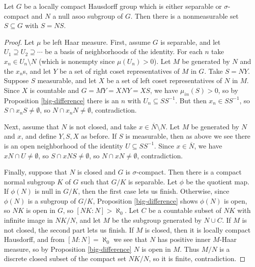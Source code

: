 \begin{lem} Let $G$ be a locally compact Hausdorff group which is either separable or $\sigma$-compact and $N$ a null asoo subgroup of $G$. Then there is a nonmeasurable set $S \subseteq G$ with $S = NS$.
\end{lem}
\begin{proof} Let $\mu$ be left Haar measure. First, assume $G$ is separable, and let $U_1 \supseteq U_2 \supseteq \cdots$ be a basis of neighborhoods of the identity. For each $n$ take $x_n \in U_n \setminus N$ (which is nonempty since $\mu(U_n) > 0$). Let $M$ be generated by $N$ and the $x_n$s, and let $Y$ be a set of right coset representatives of $M$ in $G$. Take $S = NY$. Suppose $S$ measurable, and let $X$ be a set of left coset representatives of $N$ in $M$. Since $X$ is countable and $G = MY = XNY = XS$, we have $\mu_{in}(S) > 0$, so by Proposition \ref{big-difference} there is an $n$ with $U_n \subseteq SS^{-1}$. But then $x_n \in SS^{-1}$, so $S\cap x_nS \ne \emptyset$, so $N\cap x_nN \ne \emptyset$, contradiction.

Next, assume that $N$ is not closed, and take $x \in \overline{N}\setminus N$. Let $M$ be generated by $N$ and $x$, and define $Y,S,X$ as before. If $S$ is measurable, then as above we see there is an open neighborhood of the identity $U \subseteq SS^{-1}$. Since $x \in \overline{N}$, we have $xN \cap U \ne \emptyset$, so $S \cap xNS \ne \emptyset$, so $N \cap xN \ne \emptyset$, contradiction.

Finally, suppose that $N$ is closed and $G$ is $\sigma$-compact. Then there is a compact normal subgroup $K$ of $G$ such that $G/K$ is separable. Let $\phi$ be the quotient map. If $\phi(N)$ is null in $G/K$, then the first case lets us finish. Otherwise, since $\phi(N)$ is a subgroup of $G/K$, Proposition \ref{big-difference} shows $\phi(N)$ is open, so $NK$ is open in $G$, so $[NK:N] > \aleph_0$. Let $C$ be a countable subset of $NK$ with infinite image in $NK/N$, and let $M$ be the subgroup generated by $N \cup C$. If $M$ is not closed, the second part lets us finish. If $M$ is closed, then it is locally compact Hausdorff, and from $[M:N] = \aleph_0$ we see that $N$ has positive inner $M$-Haar measure, so by Proposition \ref{big-difference} $N$ is open in $M$. Thus $M/N$ is a discrete closed subset of the compact set $NK/N$, so it is finite, contradiction.
\end{proof}

